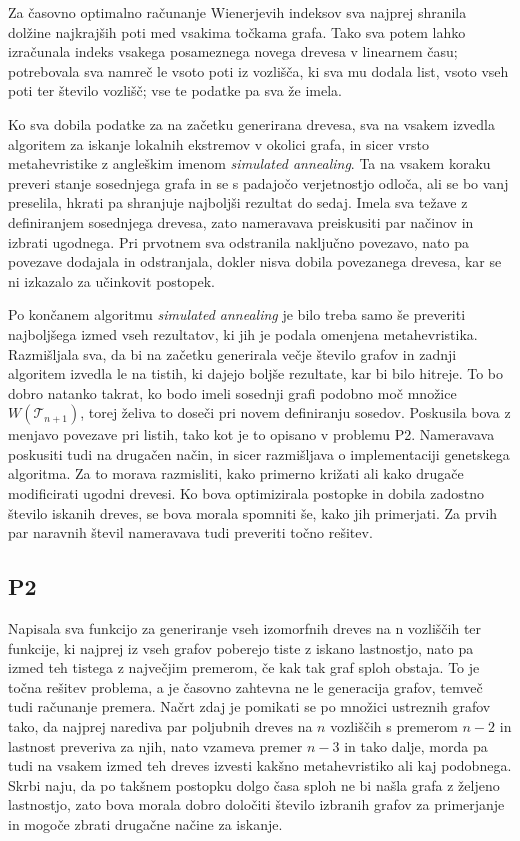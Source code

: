 \documentclass[a4paper, 12 pt]{article}
\begin{document}
Za časovno optimalno računanje Wienerjevih indeksov sva najprej shranila dolžine najkrajših poti med vsakima točkama grafa. Tako sva potem lahko izračunala indeks vsakega posameznega novega drevesa v linearnem času; potrebovala sva namreč le vsoto poti iz vozlišča, ki sva mu dodala list, vsoto vseh poti ter število vozlišč; vse te podatke pa sva že imela. \newline

 Ko sva dobila podatke za na začetku generirana drevesa, sva na vsakem izvedla algoritem za iskanje lokalnih ekstremov v okolici grafa, in sicer vrsto metahevristike z angleškim imenom \textit{simulated annealing}. Ta na vsakem koraku preveri stanje sosednjega grafa in se s padajočo verjetnostjo odloča, ali se bo vanj preselila, hkrati pa shranjuje najboljši rezultat do sedaj. Imela sva težave z definiranjem sosednjega drevesa, zato nameravava preiskusiti par načinov in izbrati ugodnega. Pri prvotnem sva odstranila naključno povezavo, nato pa povezave dodajala in odstranjala, dokler nisva dobila povezanega drevesa, kar se ni izkazalo za učinkovit postopek. \newline

Po končanem algoritmu \textit{simulated annealing} je bilo treba samo še preveriti najboljšega izmed vseh rezultatov, ki jih je podala omenjena metahevristika. Razmišljala sva, da bi na začetku generirala večje število grafov in zadnji algoritem izvedla le na tistih, ki dajejo boljše rezultate, kar bi bilo hitreje. To bo dobro natanko takrat, ko bodo imeli sosednji grafi podobno moč množice $W(\mathscr{T}_{n+1})$, torej želiva to doseči pri novem definiranju sosedov. Poskusila bova z menjavo povezave pri listih, tako kot je to opisano v problemu P2. Nameravava poskusiti tudi na drugačen način, in sicer razmišljava o implementaciji genetskega algoritma. Za to morava razmisliti, kako primerno križati ali kako drugače modificirati ugodni drevesi. Ko bova optimizirala postopke in dobila zadostno število iskanih dreves, se bova morala spomniti še, kako jih primerjati. Za prvih par naravnih števil nameravava tudi preveriti točno rešitev.

\subsection{P2}
Napisala sva funkcijo za generiranje vseh izomorfnih dreves na n vozliščih ter funkcije, ki najprej iz vseh grafov poberejo tiste z iskano lastnostjo, nato pa izmed teh tistega z največjim premerom, če kak tak graf sploh obstaja. To je točna rešitev problema, a je časovno zahtevna ne le generacija grafov, temveč tudi računanje premera. Načrt zdaj je pomikati se po množici ustreznih grafov tako, da najprej narediva par poljubnih dreves na $n$ vozliščih s premerom $n - 2$ in lastnost preveriva za njih, nato vzameva premer $n - 3$ in tako dalje, morda pa tudi na vsakem izmed teh dreves izvesti kakšno metahevristiko ali kaj podobnega. Skrbi naju, da po takšnem postopku dolgo časa sploh ne bi našla grafa z željeno lastnostjo, zato bova morala dobro določiti število izbranih grafov za primerjanje in mogoče zbrati drugačne načine za iskanje.
\end{document}
